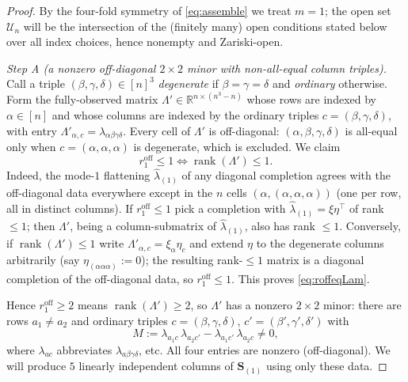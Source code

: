 \begin{proof}
By the four-fold symmetry of \eqref{eq:assemble} we treat $m=1$; the open set $\mathcal U_n$
will be the intersection of the (finitely many) open conditions stated below over all index
choices, hence nonempty and Zariski-open.

\medskip\noindent\emph{Step A (a nonzero off-diagonal $2\times2$ minor with non-all-equal
column triples).}
Call a triple $(\beta,\gamma,\delta)\in[n]^3$ \emph{degenerate} if $\beta=\gamma=\delta$
and \emph{ordinary} otherwise. Form the fully-observed matrix
$\Lambda'\in\mathbb R^{n\times(n^3-n)}$ whose rows are indexed by $\alpha\in[n]$ and whose
columns are indexed by the ordinary triples $c=(\beta,\gamma,\delta)$, with entry
$\Lambda'_{\alpha,c}=\lambda_{\alpha\beta\gamma\delta}$. Every cell of $\Lambda'$ is
off-diagonal: $(\alpha,\beta,\gamma,\delta)$ is all-equal only when $c=(\alpha,\alpha,\alpha)$
is degenerate, which is excluded. We claim
\begin{equation}\label{eq:roffeqLam}
r_1^{\mathrm{off}}\le1\iff\operatorname{rank}(\Lambda')\le1 .
\end{equation}
Indeed, the mode-$1$ flattening $\widehat\lambda_{(1)}$ of any diagonal completion agrees
with the off-diagonal data everywhere except in the $n$ cells
$(\alpha,(\alpha,\alpha,\alpha))$ (one per row, all in distinct columns). If
$r_1^{\mathrm{off}}\le1$ pick a completion with $\widehat\lambda_{(1)}=\xi\eta^{\!\top}$
of rank $\le1$; then $\Lambda'$, being a column-submatrix of $\widehat\lambda_{(1)}$, also
has rank $\le1$. Conversely, if $\operatorname{rank}(\Lambda')\le1$ write
$\Lambda'_{\alpha,c}=\xi_\alpha\eta_c$ and extend $\eta$ to the degenerate columns
arbitrarily (say $\eta_{(\alpha\alpha\alpha)}:=0$); the resulting rank-$\le1$ matrix is a
diagonal completion of the off-diagonal data, so $r_1^{\mathrm{off}}\le1$. This proves
\eqref{eq:roffeqLam}.

Hence $r_1^{\mathrm{off}}\ge2$ means $\operatorname{rank}(\Lambda')\ge2$, so $\Lambda'$ has
a nonzero $2\times2$ minor: there are rows $a_1\ne a_2$ and ordinary triples
$c=(\beta,\gamma,\delta)$, $c'=(\beta',\gamma',\delta')$ with
\begin{equation}\label{eq:Mnonzero}
M:=\lambda_{a_1 c}\,\lambda_{a_2 c'}-\lambda_{a_1 c'}\,\lambda_{a_2 c}\ne0 ,
\end{equation}
where $\lambda_{ac}$ abbreviates $\lambda_{a\beta\gamma\delta}$, etc. All four entries are
nonzero (off-diagonal). We will produce $5$ linearly independent columns of $\mathbf S_{(1)}$
using only these data.


\end{proof}
